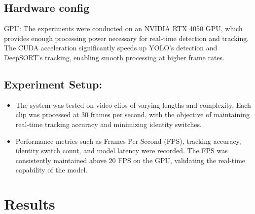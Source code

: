 \documentclass[twoside,english]{article}
\begin{document}
    \vspace{-0.6cm} 
    \subsection{Hardware config}
        GPU: The experiments were conducted on an NVIDIA RTX 4050 GPU, which provides enough processing power necessary for real-time detection and tracking. The CUDA acceleration significantly speeds up YOLO’s detection and DeepSORT’s tracking, enabling smooth processing at higher frame rates.

    \vspace{-0.5cm} 
    \subsection{Experiment Setup:}
    \begin{itemize}
    \setlength{\itemsep}{0.5mm}
        \item The system was tested on video clips of varying lengths and complexity. Each clip was processed at 30 frames per second, with the objective of maintaining real-time tracking accuracy and minimizing identity switches.
        \item Performance metrics such as Frames Per Second (FPS), tracking accuracy, identity switch count, and model latency were recorded. The FPS was consistently maintained above 20 FPS on the GPU, validating the real-time capability of the model.
    \end{itemize}

\section{Results}\label{sec:results}
\end{document}
